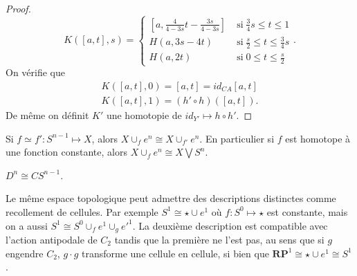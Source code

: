 \documentclass[main.tex]{subfiles}
\begin{document}
\begin{proof}
\[			K([a,t],s) = \begin{cases}
				[a, \frac{4}{4-3s}t-\frac{3s}{4-3s}] \; &\text{si} \; \frac{3}{4}s \le t \le 1 \\
				H(a,3s-4t) \; &\text{si} \; \frac{s}{2} \le t \le \frac{3}{4}s \\
				H(a,2t) \; &\text{si} \; 0 \le t \le \frac{s}{2}
			\end{cases}
		.\] 
		On vérifie que 
		\begin{align*}
			K([a,t],0) = [a,t] = id_{CA}[a,t] \\
			K([a,t],1) = (h'\circ h)([a,t])
		.\end{align*}
		De même on définit $K'$ une homotopie de $id_{Y'} \longmapsto h \circ h'$.
	\end{proof}
	\begin{cor}
		Si $f \simeq f' : S^{n-1} \longmapsto X$, alors $X \cup_f e^n \cong X \cup_{f'}e^n$. En particulier si $f$ est homotope à une fonction constante, alors $X \cup_f e^n \cong X \bigvee S^n$.
	\end{cor}
	\begin{prop}
		$D^n \cong CS^{n-1}$.
	\end{prop}
	\begin{example}
		Le même espace topologique peut admettre des descriptions distinctes comme recollement de cellules. Par exemple $S^1 \cong \star \cup e^1$ où  $f : S^0 \longmapsto \star$ est constante, mais on a aussi $S^1 \cong S^0 \cup_f e^1 \cup_g e'^1$. La deuxième description est compatible avec l'action antipodale de $C_2$ tandis que la première ne l'est pas, au sens que si $g$ engendre  $C_2$,  $g \cdot g$ transforme une cellule en cellule, si bien que $\mathbf{RP}^1 \cong \star \cup e^1 \cong S^1$.
	\end{example}
\end{document}
